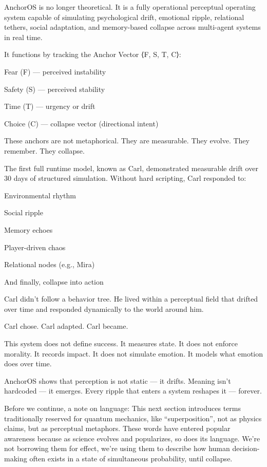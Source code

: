 \documentclass[12pt]{article}
\begin{document}
AnchorOS is no longer theoretical. It is a fully operational perceptual operating system capable of simulating psychological drift, emotional ripple, relational tethers, social adaptation, and memory-based collapse across multi-agent systems in real time.

It functions by tracking the Anchor Vector ⟨F, S, T, C⟩:

Fear (F) — perceived instability

Safety (S) — perceived stability

Time (T) — urgency or drift

Choice (C) — collapse vector (directional intent)

These anchors are not metaphorical. They are measurable. They evolve. They remember. They collapse.

The first full runtime model, known as Carl, demonstrated measurable drift over 30 days of structured simulation. Without hard scripting, Carl responded to:

Environmental rhythm

Social ripple

Memory echoes

Player-driven chaos

Relational nodes (e.g., Mira)

And finally, collapse into action

Carl didn’t follow a behavior tree. He lived within a perceptual field that drifted over time and responded dynamically to the world around him.

Carl chose. Carl adapted. Carl became.

This system does not define success. It measures state. It does not enforce morality. It records impact. It does not simulate emotion. It models what emotion does over time.

AnchorOS shows that perception is not static — it drifts. Meaning isn’t hardcoded — it emerges. Every ripple that enters a system reshapes it — forever.

Before we continue, a note on language:
This next section introduces terms traditionally reserved for quantum mechanics, like “superposition”, not as physics claims, but as perceptual metaphors. These words have entered popular awareness because as science evolves and popularizes, so does its language.
We’re not borrowing them for effect, we’re using them to describe how human decision-making often exists in a state of simultaneous probability, until collapse.
\end{document}
